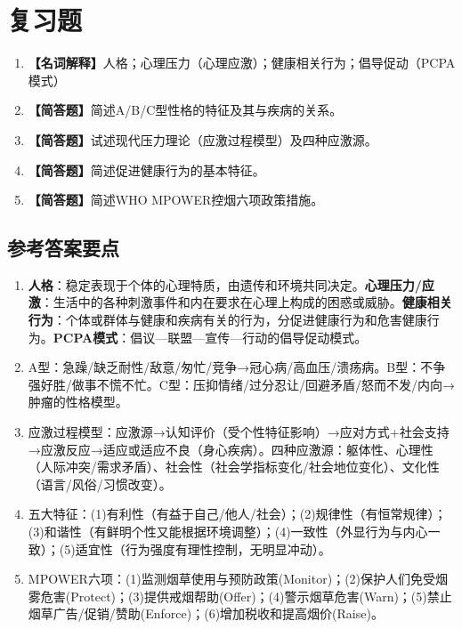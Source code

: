 \section{复习题}

\begin{enumerate}[leftmargin=*, itemsep=8pt]
    \item \textbf{【名词解释】}人格；心理压力（心理应激）；健康相关行为；倡导促动（PCPA模式）
    \item \textbf{【简答题】}简述A/B/C型性格的特征及其与疾病的关系。
    \item \textbf{【简答题】}试述现代压力理论（应激过程模型）及四种应激源。
    \item \textbf{【简答题】}简述促进健康行为的基本特征。
    \item \textbf{【简答题】}简述WHO MPOWER控烟六项政策措施。
\end{enumerate}

\subsection*{参考答案要点}

\begin{enumerate}[leftmargin=*, itemsep=5pt]
    \item \textbf{人格}：稳定表现于个体的心理特质，由遗传和环境共同决定。\textbf{心理压力/应激}：生活中的各种刺激事件和内在要求在心理上构成的困惑或威胁。\textbf{健康相关行为}：个体或群体与健康和疾病有关的行为，分促进健康行为和危害健康行为。\textbf{PCPA模式}：倡议—联盟—宣传—行动的倡导促动模式。
    \item A型：急躁/缺乏耐性/敌意/匆忙/竞争→冠心病/高血压/溃疡病。B型：不争强好胜/做事不慌不忙。C型：压抑情绪/过分忍让/回避矛盾/怒而不发/内向→肿瘤的性格模型。
    \item 应激过程模型：应激源→认知评价（受个性特征影响）→应对方式+社会支持→应激反应→适应或适应不良（身心疾病）。四种应激源：躯体性、心理性（人际冲突/需求矛盾）、社会性（社会学指标变化/社会地位变化）、文化性（语言/风俗/习惯改变）。
    \item 五大特征：(1)有利性（有益于自己/他人/社会）；(2)规律性（有恒常规律）；(3)和谐性（有鲜明个性又能根据环境调整）；(4)一致性（外显行为与内心一致）；(5)适宜性（行为强度有理性控制，无明显冲动）。
    \item MPOWER六项：(1)监测烟草使用与预防政策(Monitor)；(2)保护人们免受烟雾危害(Protect)；(3)提供戒烟帮助(Offer)；(4)警示烟草危害(Warn)；(5)禁止烟草广告/促销/赞助(Enforce)；(6)增加税收和提高烟价(Raise)。
\end{enumerate}

\newpage
